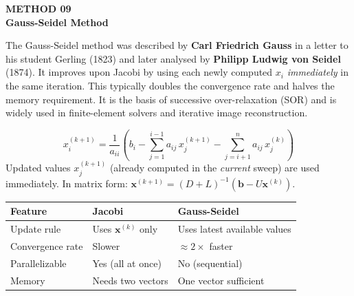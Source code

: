 \documentclass[12pt]{article}
\newcommand{\hcell}[1]{\textbf{\color{white}#1}}
\begin{document}
\newpage


\begin{tcolorbox}[
  enhanced, arc=0pt, boxrule=0pt,
  colback=primary, colframe=primary,
  left=16pt, right=16pt, top=14pt, bottom=10pt,
  borderline south={4pt}{0pt}{accent},
]
  {\color{accent!70}\small\bfseries METHOD 09}\\[4pt]
  {\LARGE\bfseries\color{white} Gauss-Seidel Method}
\end{tcolorbox}

\vspace{10pt}

\begin{histbox}
The Gauss-Seidel method was described by \textbf{Carl Friedrich Gauss} in a letter to his student Gerling (1823) and later analysed by \textbf{Philipp Ludwig von Seidel} (1874). It improves upon Jacobi by using each newly computed $x_i$ \textit{immediately} in the same iteration. This typically doubles the convergence rate and halves the memory requirement. It is the basis of successive over-relaxation (SOR) and is widely used in finite-element solvers and iterative image reconstruction.
\end{histbox}

\bigskip

\begin{defbox}
\[
  \boxed{x_i^{(k+1)} = \frac{1}{a_{ii}}\left(b_i - \sum_{j=1}^{i-1} a_{ij}\,x_j^{(k+1)} - \sum_{j=i+1}^{n} a_{ij}\,x_j^{(k)}\right)}
\]
Updated values $x_j^{(k+1)}$ (already computed in the \textit{current} sweep) are used immediately. In matrix form: $\mathbf{x}^{(k+1)} = (D+L)^{-1}(\mathbf{b} - U\mathbf{x}^{(k)})$.
\end{defbox}

\begin{derivbox}
\begin{center}{\small
\begin{tabular}{p{4.5cm} p{5cm} p{4.5cm}}
\toprule
\rowcolor{primary}
\hcell{Feature} & \hcell{Jacobi} & \hcell{Gauss-Seidel} \\
\midrule
\rowcolor{amberbg}
Update rule & Uses $\mathbf{x}^{(k)}$ only & Uses latest available values \\
Convergence rate & Slower & $\approx 2\times$ faster \\
\rowcolor{amberbg}
Parallelizable & Yes (all at once) & No (sequential) \\
Memory & Needs two vectors & One vector sufficient \\
\bottomrule
\end{tabular}
}\end{center}
\end{derivbox}
\end{document}
